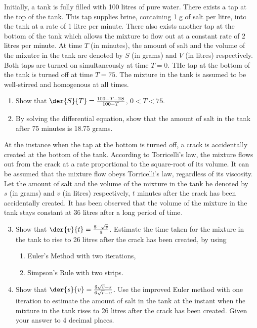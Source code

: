 \begin{problem}
    Initially, a tank is fully filled with 100 litres of pure water. There exists a tap at the top of the tank. This tap supplies brine, containing 1 g of salt per litre, into the tank at a rate of 1 litre per minute. There also exists another tap at the bottom of the tank which allows the mixture to flow out at a constant rate of 2 litres per minute. At time $T$ (in minutes), the amount of salt and the volume of the mixutre in the tank are denoted by $S$ (in grams) and $V$ (in litres) respectively. Both taps are turned on simultaneously at time $T = 0$. THe tap at the bottom of the tank is turned off at time $T = 75$. The mixture in the tank is assumed to be well-stirred and homogenous at all times.
    \begin{enumerate}
        \item Show that $\der{S}{T} = \frac{100-T-2S}{100-T}$, $0 < T < 75$.
        \item By solving the differential equation, show that the amount of salt in the tank after 75 minutes is 18.75 grams.
    \end{enumerate}
    At the instance when the tap at the bottom is turned off, a crack is accidentally created at the bottom of the tank. According to Torricelli's law, the mixture flows out from the crack at a rate proportional to the square-root of its volume. It can be assumed that the mixture flow obeys Torricelli's law, regardless of its viscosity. Let the amount of salt and the volume of the mixture in the tank be denoted by $s$ (in grams) and $v$ (in litres) respectively, $t$ minutes after the crack has been accidentally created. It has been observed that the volume of the mixture in the tank stays constant at 36 litres after a long period of time.
    \begin{enumerate}
        \setcounter{enumi}{2}
        \item Show that $\der{v}{t} = \frac{6-\sqrt{v}}{6}$. Estimate the time taken for the mixture in the tank to rise to 26 litres after the crack has been created, by using
        \begin{enumerate}
            \item Euler's Method with two iterations,
            \item Simpson's Rule with two strips.
        \end{enumerate}
        \item Show that $\der{s}{v} = \frac{6\sqrt{v} - s}{6\sqrt{v} - v}$. Use the improved Euler method with one iteration to estimate the amount of salt in the tank at the instant when the mixture in the tank rises to 26 litres after the crack has been created. Given your answer to 4 decimal places.
    \end{enumerate}
\end{problem}

